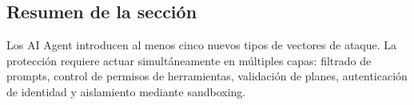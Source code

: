 \subsection{Resumen de la sección}

Los AI Agent introducen al menos cinco nuevos tipos de vectores de ataque. La protección requiere actuar simultáneamente en múltiples capas: filtrado de prompts, control de permisos de herramientas, validación de planes, autenticación de identidad y aislamiento mediante sandboxing.

